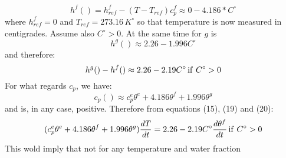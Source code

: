 \begin{equation}
h^f() = h^f_{ref} -(T-T_{ref})c_p^f \approx 0 - 4.186*  C^\circ   
\end{equation}
where \(h_{ref}^f=0\) and \(T_{ref} = 273.16\, K^\circ\) so that temperature is now measured in centigrades. Assume also \(C^\circ >0 \).
At the same time for \(g\) is 
\begin{equation}
h^g( ) \approx 2.26  - 1.996 C^\circ
\end{equation}
and therefore:
\begin{equation}
h^g()-h^f() \approx 2.26 - 2.19 C^\circ \, {\rm if}\ C^\circ > 0
\end{equation}
For what regards \( c_p\), we have:
\begin{equation}
c_p() \approx c_p^e \theta^e + 4.186 \theta^f + 1.996 \theta^g
\end{equation}
and is, in any case, positive.
Therefore from equations (15), (19) and (20):
\begin{equation}
(c_p^e \theta^e + 4.186 \theta^f + 1.996 \theta^g) \frac{dT}{dt} = 2.26 - 2.19 C^\circ \frac{d\theta^f}{dt}\, {\rm if}\ C^\circ > 0
\end{equation}
This wold imply that not for any temperature and water fraction 
